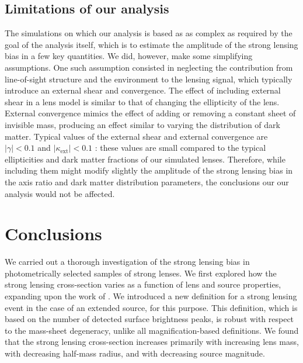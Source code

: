 \documentclass{aa}
\begin{document}
\subsection{Limitations of our analysis}

The simulations on which our analysis is based as as complex as required by the goal of the analysis itself, which is to estimate the amplitude of the strong lensing bias in a few key quantities.
We did, however, make some simplifying assumptions.
One such assumption consisted in neglecting the contribution from line-of-sight structure and the environment to the lensing signal, which typically introduce an external shear and convergence.
The effect of including external shear in a lens model is similar to that of changing the ellipticity of the lens. %
External convergence mimics the effect of adding or removing a constant sheet of invisible mass, producing an effect similar to varying the distribution of dark matter.
Typical values of the external shear and external convergence are $|\gamma|<0.1$ and $|\kappa_{\mathrm{ext}}|<0.1$ \citep{Mil++20}: these values are small compared to the typical ellipticities and dark matter fractions of our simulated lenses.
Therefore, while including them might modify slightly the amplitude of the strong lensing bias in the axis ratio and dark matter distribution parameters, the conclusions our our analysis would not be affected.


\section{Conclusions}\label{sect:concl}

We carried out a thorough investigation of the strong lensing bias in photometrically selected samples of strong lenses.
We first explored how the strong lensing cross-section varies as a function of lens and source properties, expanding upon the work of \citet{MVK09}. %
We introduced a new definition for a strong lensing event in the case of an extended source, for this purpose.
This definition, which is based on the number of detected surface brightness peaks, is robust with respect to the mass-sheet degeneracy, unlike all magnification-based definitions.
We found that the strong lensing cross-section increases primarily with increasing lens mass, with decreasing half-mass radius, and with decreasing source magnitude.
\end{document}
